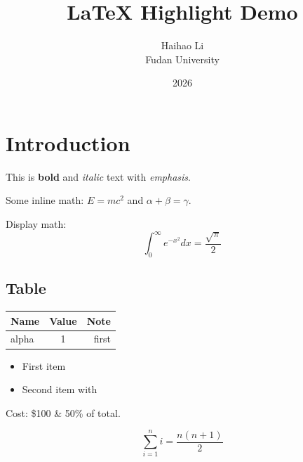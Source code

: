 \documentclass[12pt]{article}
\title{LaTeX Highlight Demo}
\author{Haihao Li \\ Fudan University}
\date{2026}
\begin{document}
\maketitle

\section{Introduction}
This is \textbf{bold} and \textit{italic} text with \emph{emphasis}.

Some inline math: $E = mc^2$ and $\alpha + \beta = \gamma$.

Display math:
\begin{equation}
  \int_0^\infty e^{-x^2} dx = \frac{\sqrt{\pi}}{2} %
\end{equation}

\subsection{Table}
\begin{tabular}{|l|c|r|}
  \hline
  Name & Value & Note \\
  \hline
  alpha & 1 & first \\
  \hline
\end{tabular}

\begin{itemize}
  \item First item
  \item Second item with \cite{ref2026}
\end{itemize}

Cost: \$100 \& 50\% of total.

\[
  \sum_{i=1}^{n} i = \frac{n(n+1)}{2}
\]
\end{document}
